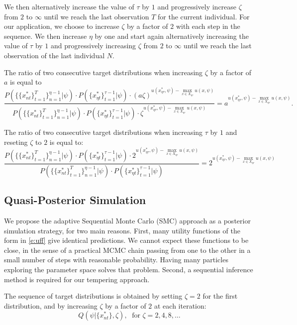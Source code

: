 \documentclass[12pt]{article}
\begin{document}
We then alternatively increase the value of $\tau$ by $1$ and progressively increase $\zeta$ from $2$ to $\infty$ until we reach the last observation $T$ for the current individual. For our application, we choose to increase $\zeta$ by a factor of $2$ with each step in the sequence. We then increase $\eta$ by one and start again alternatively increasing the value of $\tau$ by $1$ and progressively increasing $\zeta$ from $2$ to $\infty$ until we reach the last observation of the last individual $N$.

The ratio of two consecutive target distributions when increasing $\zeta$ by a factor of $a$ is equal to
$$ \frac{P(\{\{x_{nt}^*\}_{t=1}^T\}_{n=1}^{\eta-1}|\psi) \cdot  P(\{x_{\eta t}^*\}_{t=1}^{\tau-1}|\psi) \cdot (a \zeta)^{ u(x_{\eta \tau}^*,\psi) - \max_{x \in X_{\eta \tau}} u(x,\psi)}}{P(\{\{x_{nt}^*\}_{t=1}^T\}_{n=1}^{\eta-1}|\psi) \cdot  P(\{x_{\eta t}^*\}_{t=1}^{\tau-1}|\psi) \cdot \zeta^{ u(x_{\eta \tau}^*,\psi) - \max_{x \in X_{\eta \tau}} u(x,\psi)}} = a^{ u(x_{\eta \tau}^*,\psi) - \max_{x \in X_{\eta \tau}} u(x,\psi)}.$$

The ratio of two consecutive target distributions when increasing $\tau$ by $1$ and reseting $\zeta$ to $2$ is equal to:
$$ \frac{  P(\{\{x_{nt}^*\}_{t=1}^T\}_{n=1}^{\eta-1}|\psi) \cdot  P(\{x_{\eta t}^*\}_{t=1}^{\tau-1}|\psi) \cdot 2^{ u(x_{\eta \tau}^*,\psi) - \max_{x \in X_{\eta \tau}} u(x,\psi)}}{P(\{\{x_{nt}^*\}_{t=1}^T\}_{n=1}^{\eta-1}|\psi) \cdot  P(\{x_{\eta t}^*\}_{t=1}^{\tau-1}|\psi)} = 2^{ u(x_{\eta \tau}^*,\psi) - \max_{x \in X_{\eta \tau}} u(x,\psi)} $$

\subsection{Quasi-Posterior Simulation}

We propose the adaptive Sequential Monte Carlo (SMC) approach \citep{DurhamGeweke2013} as a posterior simulation strategy, for two main reasons.
First, many utility functions of the form in \eqref{e:uff} give identical predictions.
We cannot expect these functions to be close, in the sense of a practical MCMC chain passing from one to the other in a small number of steps with reasonable probability. Having many particles exploring the parameter space solves that problem.
Second, a sequential inference method is required for our tempering approach.

The sequence of target distributions is obtained by setting $\zeta=2$ for the first distribution, and by increasing $\zeta$ by a factor of $2$ at each iteration:
$$ Q(\psi|\{x_{nt}^*\},\zeta), \; \text{ for } \zeta=2,4,8,\ldots $$ 
\end{document}
